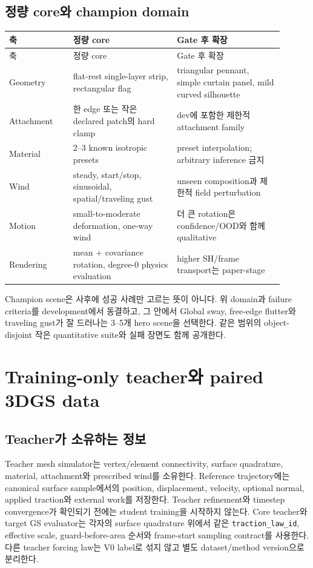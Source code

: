 \documentclass[11pt]{article}
\newcommand{\code}[1]{{\small\nolinkurl{#1}}}
\begin{document}
\subsection{정량 core와 champion domain}

\begin{longtable}{L{0.21\linewidth}L{0.34\linewidth}L{0.35\linewidth}}
\toprule
축 & 정량 core & Gate 후 확장\\
\midrule
\endfirsthead
\toprule
축 & 정량 core & Gate 후 확장\\
\midrule
\endhead
Geometry & flat-rest single-layer strip, rectangular flag & triangular pennant, simple curtain panel, mild curved silhouette\\
Attachment & 한 edge 또는 작은 declared patch의 hard clamp & dev에 포함한 제한적 attachment family\\
Material & 2--3 known isotropic presets & preset interpolation; arbitrary inference 금지\\
Wind & steady, start/stop, sinusoidal, spatial/traveling gust & unseen composition과 제한적 field perturbation\\
Motion & small-to-moderate deformation, one-way wind & 더 큰 rotation은 confidence/OOD와 함께 qualitative\\
Rendering & mean + covariance rotation, degree-0 physics evaluation & higher SH/frame transport는 paper-stage\\
\bottomrule
\end{longtable}

Champion scene은 사후에 성공 사례만 고르는 뜻이 아니다. 위 domain과 failure criteria를 development에서 동결하고,
그 안에서 Global sway, free-edge flutter와 traveling gust가 잘 드러나는 3--5개 hero scene을 선택한다.
같은 범위의 object-disjoint 작은 quantitative suite와 실패 장면도 함께 공개한다.

\section{Training-only teacher와 paired 3DGS data}

\subsection{Teacher가 소유하는 정보}

Teacher mesh simulator는 vertex/element connectivity, surface quadrature, material, attachment와
prescribed wind를 소유한다. Reference trajectory에는 canonical surface sample에서의
position, displacement, velocity, optional normal, applied traction와 external work를 저장한다.
Teacher refinement와 timestep convergence가 확인되기 전에는 student training을 시작하지 않는다.
Core teacher와 target GS evaluator는 각자의 surface quadrature 위에서 같은
\code{traction_law_id}, effective scale, guard-before-area 순서와 frame-start sampling contract를 사용한다.
다른 teacher forcing law는 V0 label로 섞지 않고 별도 dataset/method version으로 분리한다.
\end{document}
